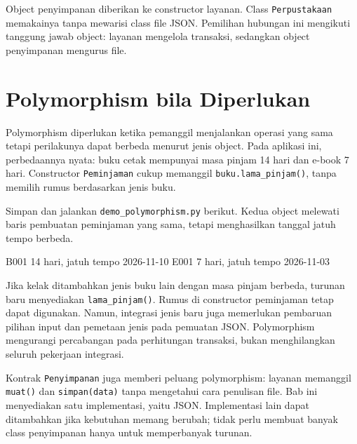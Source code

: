 Object penyimpanan diberikan ke constructor layanan. Class \texttt{Perpustakaan} memakainya tanpa mewarisi class file JSON. Pemilihan hubungan ini mengikuti tanggung jawab object: layanan mengelola transaksi, sedangkan object penyimpanan mengurus file.

\section{Polymorphism bila Diperlukan}

Polymorphism diperlukan ketika pemanggil menjalankan operasi yang sama tetapi perilakunya dapat berbeda menurut jenis object. Pada aplikasi ini, perbedaannya nyata: buku cetak mempunyai masa pinjam 14 hari dan e-book 7 hari. Constructor \texttt{Peminjaman} cukup memanggil \texttt{buku.lama\_pinjam()}, tanpa memilih rumus berdasarkan jenis buku.

Simpan dan jalankan \texttt{demo\_polymorphism.py} berikut. Kedua object melewati baris pembuatan peminjaman yang sama, tetapi menghasilkan tanggal jatuh tempo berbeda.

\begin{kode}
\end{kode}

\begin{keluaran}
B001 14 hari, jatuh tempo 2026-11-10
E001 7 hari, jatuh tempo 2026-11-03
\end{keluaran}

Jika kelak ditambahkan jenis buku lain dengan masa pinjam berbeda, turunan baru menyediakan \texttt{lama\_pinjam()}. Rumus di constructor peminjaman tetap dapat digunakan. Namun, integrasi jenis baru juga memerlukan pembaruan pilihan input dan pemetaan jenis pada pemuatan JSON. Polymorphism mengurangi percabangan pada perhitungan transaksi, bukan menghilangkan seluruh pekerjaan integrasi.

Kontrak \texttt{Penyimpanan} juga memberi peluang polymorphism: layanan memanggil \texttt{muat()} dan \texttt{simpan(data)} tanpa mengetahui cara penulisan file. Bab ini menyediakan satu implementasi, yaitu JSON. Implementasi lain dapat ditambahkan jika kebutuhan memang berubah; tidak perlu membuat banyak class penyimpanan hanya untuk memperbanyak turunan.

